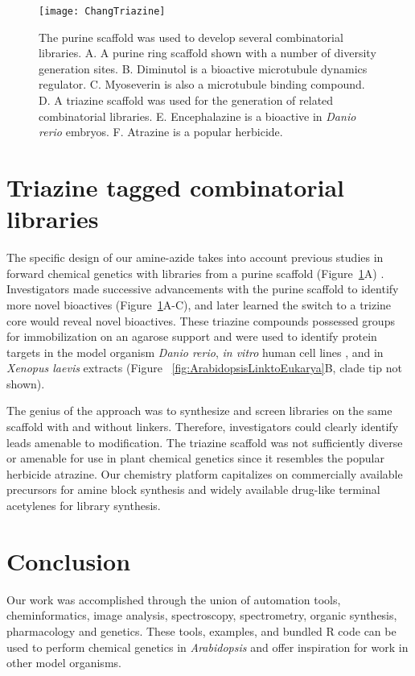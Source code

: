 \begin{figure}
\texttt{[image: ChangTriazine]}
\caption{The purine scaffold was used to develop several combinatorial libraries. A. A purine ring scaffold shown with a number of diversity generation sites. B. Diminutol is a bioactive microtubule dynamics regulator. C. Myoseverin is also a microtubule binding compound. D. A triazine scaffold was used for the generation of related combinatorial libraries. E. Encephalazine is a bioactive in {\it Danio rerio} embryos. F. Atrazine is a popular herbicide.}
\label{fig:TriazineTaggedLibraries}
\end{figure}

\section{Triazine tagged combinatorial libraries}

The specific design of our amine-azide takes into account previous studies in forward chemical genetics with libraries from a purine scaffold (Figure~\ref{fig:TriazineTaggedLibraries}A) \cite{wignall2004identification}. Investigators made successive advancements with the purine scaffold to identify more novel bioactives (Figure~\ref{fig:TriazineTaggedLibraries}A-C), and later learned the switch to a trizine core would reveal novel bioactives. These triazine compounds possessed groups for immobilization on an agarose support and were used to identify protein targets in the model organism {\it Danio rerio}, {\it in vitro} human cell lines \cite{moon2002novel,williams2004identification,ni2005triazine}, and in {\it Xenopus laevis} extracts \cite{wignall2004identification} (Figure ~\ref{fig:ArabidopsisLinktoEukarya}B, clade tip not shown).

The genius of the approach was to synthesize and screen libraries on the same scaffold with and without linkers. Therefore, investigators could clearly identify leads amenable to modification. The triazine scaffold was not sufficiently diverse or amenable for use in plant chemical genetics since it resembles the popular herbicide atrazine. Our chemistry platform capitalizes on commercially available precursors for amine block synthesis and widely available drug-like terminal acetylenes for library synthesis.



\section{Conclusion}

Our work was accomplished through the union of automation tools, cheminformatics, image analysis, spectroscopy, spectrometry, organic synthesis, pharmacology and genetics. These tools, examples, and bundled R code can be used to perform chemical genetics in {\it Arabidopsis} and offer inspiration for work in other model organisms.


